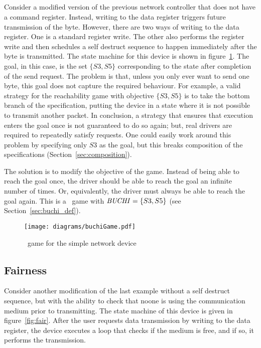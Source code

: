 \subsection{\buchi}

Consider a modified version of the previous network controller that does not have a command register. Instead, writing to the data register triggers future transmission of the byte. However, there are two ways of writing to the data register. One is a standard register write. The other also performs the register write and then schedules a self destruct sequence to happen immediately after the byte is transmitted. The state machine for this device is shown in figure~\ref{fig:buchi}. The goal, in this case, is the set $\{S3, S5\}$ corresponding to the state after completion of the send request. The problem is that, unless you only ever want to send one byte, this goal does not capture the required behaviour. For example, a valid strategy for the reachability game with objective $\{S3, S5\}$ is to take the bottom branch of the specification, putting the device in a state where it is not possible to transmit another packet. In conclusion, a strategy that ensures that execution enters the goal once is not guaranteed to do so again; but, real drivers are required to repeatedly satisfy requests. One could easily work around this problem by specifying only ${S3}$ as the goal, but this breaks composition of the specifications (Section~\ref{sec:composition}).

The solution is to modify the objective of the game. Instead of being able to reach the goal once, the driver should be able to reach the goal an infinite number of times. Or, equivalently, the driver must always be able to reach the goal again. This is a \buchi\ game with $\mathit{BUCHI} = \{S3, S5\}$ (see Section~\ref{sec:buchi_def}).

\begin{figure}
\centering
\texttt{[image: diagrams/buchiGame.pdf]}
\caption{\buchi\ game for the simple network device}
\label{fig:buchi}
\end{figure}

\subsection{Fairness}
\label{sec:game_fairness}

Consider another modification of the last example without a self destruct sequence, but with the ability to check that noone is using the communication medium prior to transmitting. The state machine of this device is given in figure~\ref{fig:fair}. After the user requests data transmission by writing to the data register, the device executes a loop that checks if the medium is free, and if so, it performs the transmission. 

